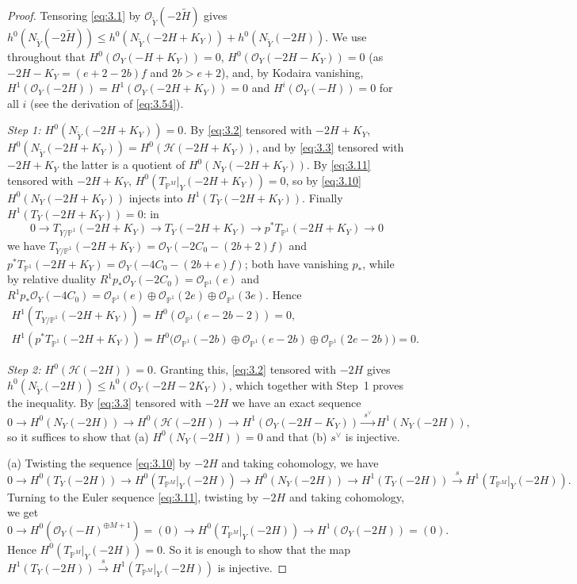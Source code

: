 \documentclass[11pt,twoside]{amsart}
\theoremstyle{plain}
\theoremstyle{definition}
\newcommand{\PP}{\mathbb{P}}
\newcommand{\PM}{\mathbb{P}^M}
\newcommand{\OO}{\mathcal{O}}
\newcommand{\Yt}{\widetilde{Y}}
\newcommand{\Ht}{\widetilde{H}}
\newcommand{\NY}{N_{Y}}
\newcommand{\NYt}{N_{\Yt}}
\newcommand{\Hc}{\mathcal{H}}
\newcommand{\TP}{T_{\PM}|_Y}
\begin{document}
\begin{proof}
Tensoring \eqref{eq:3.1} by $\OO_{\Yt}(-2\Ht)$ gives $h^0(\NYt(-2\Ht))\le h^0(\NYt(-2H+K_Y))+h^0(\NYt(-2H))$. We use throughout that $H^0(\OO_Y(-H+K_Y))=0$, $H^0(\OO_Y(-2H-K_Y))=0$ (as $-2H-K_Y=(e+2-2b)f$ and $2b>e+2$), and, by Kodaira vanishing, $H^1(\OO_Y(-2H))=H^1(\OO_Y(-2H+K_Y))=0$ and $H^i(\OO_Y(-H))=0$ for all $i$ (see the derivation of \eqref{eq:3.54}).

\emph{Step 1: $H^0(\NYt(-2H+K_Y))=0$.} By \eqref{eq:3.2} tensored with $-2H+K_Y$, $H^0(\NYt(-2H+K_Y))=H^0(\Hc(-2H+K_Y))$, and by \eqref{eq:3.3} tensored with $-2H+K_Y$ the latter is a quotient of $H^0(\NY(-2H+K_Y))$. By \eqref{eq:3.11} tensored with $-2H+K_Y$, $H^0(\TP(-2H+K_Y))=0$, so by \eqref{eq:3.10} $H^0(\NY(-2H+K_Y))$ injects into $H^1(T_Y(-2H+K_Y))$. Finally $H^1(T_Y(-2H+K_Y))=0$: in
\[
0\to T_{Y/\PP^1}(-2H+K_Y)\to T_Y(-2H+K_Y)\to p^*T_{\PP^1}(-2H+K_Y)\to0
\]
we have $T_{Y/\PP^1}(-2H+K_Y)=\OO_Y(-2C_0-(2b+2)f)$ and $p^*T_{\PP^1}(-2H+K_Y)=\OO_Y(-4C_0-(2b+e)f)$; both have vanishing $p_*$, while by relative duality $R^1p_*\OO_Y(-2C_0)=\OO_{\PP^1}(e)$ and $R^1p_*\OO_Y(-4C_0)=\OO_{\PP^1}(e)\oplus\OO_{\PP^1}(2e)\oplus\OO_{\PP^1}(3e)$. Hence
\begin{gather*}
H^1(T_{Y/\PP^1}(-2H+K_Y))=H^0(\OO_{\PP^1}(e-2b-2))=0,\\
H^1(p^*T_{\PP^1}(-2H+K_Y))=H^0\big(\OO_{\PP^1}(-2b)\oplus\OO_{\PP^1}(e-2b)\oplus\OO_{\PP^1}(2e-2b)\big)=0 .
\end{gather*}

\emph{Step 2: $H^0(\Hc(-2H))=0$.} Granting this, \eqref{eq:3.2} tensored with $-2H$ gives $h^0(\NYt(-2H))\le h^0(\OO_Y(-2H-2K_Y))$, which together with Step~1 proves the inequality. By \eqref{eq:3.3} tensored with $-2H$ we have an exact sequence
\[
0\to H^0(\NY(-2H))\to H^0(\Hc(-2H))\to H^1(\OO_Y(-2H-K_Y))\xrightarrow{\ s^{\vee}\ }H^1(\NY(-2H)),
\]
so it suffices to show that (a) $H^0(\NY(-2H))=0$ and that (b) $s^{\vee}$ is injective.

(a) Twisting the sequence \eqref{eq:3.10} by $-2H$ and taking cohomology, we have
\[
0\to H^0(T_Y(-2H))\to H^0(\TP(-2H))\to H^0(\NY(-2H))\to H^1(T_Y(-2H))\xrightarrow{\ s\ }H^1(\TP(-2H)) .
\]
Turning to the Euler sequence \eqref{eq:3.11}, twisting by $-2H$ and taking cohomology, we get
\[
0\to H^0(\OO_Y(-H)^{\oplus M+1})=(0)\to H^0(\TP(-2H))\to H^1(\OO_Y(-2H))=(0) .
\]
Hence $H^0(\TP(-2H))=0$. So it is enough to show that the map $H^1(T_Y(-2H))\xrightarrow{\ s\ }H^1(\TP(-2H))$ is injective.


\end{proof}
\end{document}
